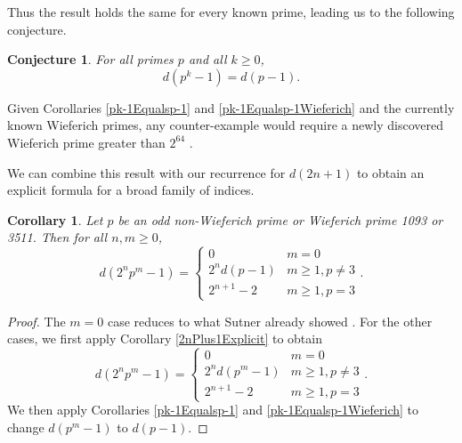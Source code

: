 \documentclass[a4paper]{article}
\newtheorem{corollary}[theorem]{Corollary}
\newtheorem{conjecture}[theorem]{Conjecture}
\begin{document}
	Thus the result holds the same for every known prime, leading us to the following conjecture.
	\begin{conjecture}
		For all primes $p$ and all $k \geq 0$,
		\begin{equation*}
			d(p^k - 1) = d(p-1).
		\end{equation*}
	\end{conjecture}
	Given Corollaries \ref{pk-1Equalsp-1} and \ref{pk-1Equalsp-1Wieferich} and the currently known Wieferich primes, any counter-example would require a newly discovered Wieferich prime greater than $2^{64}$ \cite{PrimeGridWieferich}.
	
	We can combine this result with our recurrence for $d(2n + 1)$ to obtain an explicit formula for a broad family of indices.
	\begin{corollary}\label{d2p-1}
		Let $p$ be an odd non-Wieferich prime or Wieferich prime 1093 or 3511.
		Then for all $n,m \geq 0$,
		\begin{equation*}
			d(2^np^m - 1) = \begin{cases}
				0 & m = 0 \\
				2^n d(p-1) & m \geq 1, p \neq 3 \\
				2^{n+1} - 2 & m \geq 1, p  = 3
			\end{cases}.
		\end{equation*}
	\end{corollary}
	\begin{proof}
		The $m=0$ case reduces to what Sutner already showed \cite{Sutner1989}.
		For the other cases, we first apply Corollary \ref{2nPlus1Explicit} to obtain
		\begin{equation*}
			d(2^np^m - 1) = \begin{cases}
				0 & m = 0 \\
				2^n d(p^m-1) & m \geq 1, p \neq 3 \\
				2^{n+1} - 2 & m \geq 1, p  = 3
			\end{cases}.
		\end{equation*}
		We then apply Corollaries \ref{pk-1Equalsp-1} and \ref{pk-1Equalsp-1Wieferich} to change $d(p^m - 1)$ to $d(p-1)$.
	\end{proof}
\end{document}
